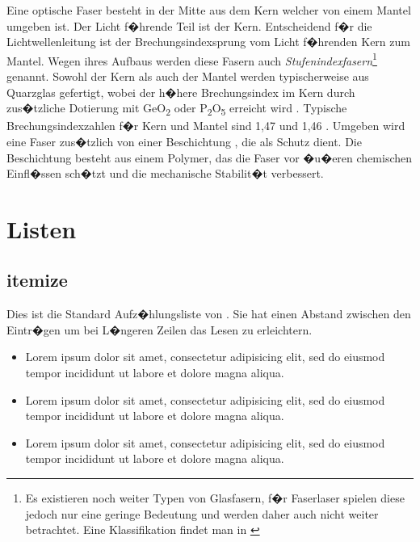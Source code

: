 Eine optische Faser besteht in der Mitte aus dem Kern  welcher von einem Mantel  umgeben ist. Der Licht f�hrende Teil ist der Kern. Entscheidend f�r die Lichtwellenleitung ist der Brechungsindexsprung vom Licht f�hrenden Kern zum Mantel.
Wegen ihres Aufbaus werden diese Fasern auch \emph{Stufenindexfasern}\footnote{Es existieren noch weiter Typen  von Glasfasern, f�r Faserlaser spielen diese jedoch nur eine geringe Bedeutung und werden daher auch nicht weiter betrachtet. Eine Klassifikation findet man in \cite{Yeh}} genannt.
Sowohl der Kern als auch der Mantel werden typischerweise aus Quarzglas gefertigt, wobei der h�here Brechungsindex im Kern durch zus�tzliche Dotierung mit GeO\textsubscript{2} oder P\textsubscript{2}O\textsubscript{5} erreicht wird \cite{Agrawal}.
Typische Brechungsindexzahlen f�r Kern und Mantel sind 1,47 und 1,46 \cite{GuidetofiberOptics}.
Umgeben wird eine Faser zus�tzlich von einer Beschichtung , die als Schutz dient.
Die Beschichtung besteht aus einem Polymer, das die Faser vor �u�eren chemischen Einfl�ssen sch�tzt und die mechanische Stabilit�t verbessert.


\section{Listen}

\subsection{itemize}
Dies ist die Standard Aufz�hlungsliste von \LaTeXe. Sie hat einen Abstand zwischen den Eintr�gen um bei L�ngeren Zeilen das Lesen zu erleichtern.

\begin{itemize}
   \item Lorem ipsum dolor sit amet, consectetur adipisicing elit, sed do eiusmod tempor incididunt ut labore et dolore magna aliqua.
%
   \item Lorem ipsum dolor sit amet, consectetur adipisicing elit, sed do eiusmod tempor incididunt ut labore et dolore magna aliqua.
%
   \item Lorem ipsum dolor sit amet, consectetur adipisicing elit, sed do eiusmod tempor incididunt ut labore et dolore magna aliqua.
\end{itemize}

